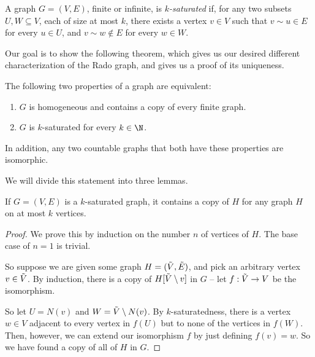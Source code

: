 \documentclass[nobib]{tufte-handout}
\begin{document}
\begin{definition}
    A graph $G = (V,E)$, finite or infinite, is \emph{$k$-saturated} if, for any two subsets $U, W \subseteq V$, each of size at most $k$, there exists a vertex $v \in V$ such that $v \sim u \in E$ for every $u \in U$, and $v \sim w \not\in E$ for every $w \in W$.
\end{definition}

Our goal is to show the following theorem, which gives us our desired different characterization of the Rado graph, and gives us a proof of its uniqueness.

\begin{theorem}\label{thm:two_rado_defs_equiv}
    The following two properties of a graph are equivalent:
    \begin{enumerate}
        \item $G$ is homogeneous and contains a copy of every finite graph.
        \item $G$ is $k$-saturated for every $k \in \N$.
    \end{enumerate}

    In addition, any two countable graphs that both have these properties are isomorphic.
\end{theorem}

We will divide this statement into three lemmas.

\begin{lemma}
    If $G = (V,E)$ is a $k$-saturated graph, it contains a copy of $H$ for any graph $H$ on at most $k$ vertices.

    \begin{proof}
        We prove this by induction on the number $n$ of vertices of $H$. The base case of $n = 1$ is trivial.

        So suppose we are given some graph $H = (\Tilde V, \Tilde E)$, and pick an arbitrary vertex $v \in \Tilde V$. By induction, there is a copy of $H[\Tilde V \setminus v]$ in $G$ -- let $f: \Tilde V \to V$ be the isomorphism. 
        
        So let $U = N(v)$ and $W = \Tilde V \setminus N(v)$. By $k$-saturatedness, there is a vertex $w \in V$ adjacent to every vertex in $f(U)$ but to none of the vertices in $f(W)$. Then, however, we can extend our isomorphism $f$ by just defining $f(v) = w$. So we have found a copy of all of $H$ in $G$.
    \end{proof}
\end{lemma}
\end{document}
